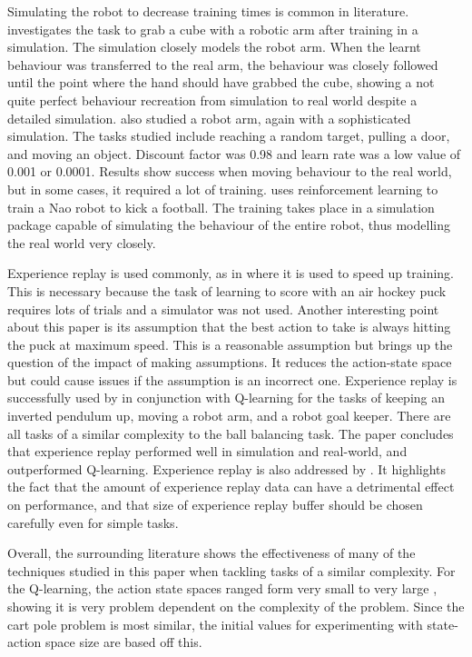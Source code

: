 \documentclass[12pt,a4paper]{article}
\begin{document}
Simulating the robot to decrease training times is common in literature. \cite{sim_robot_arm} investigates the task to grab a cube with a robotic arm after training in a simulation. The simulation closely models the robot arm. When the learnt behaviour was transferred to the real arm, the behaviour was closely followed until the point where the hand should have grabbed the cube, showing a not quite perfect behaviour recreation from simulation to real world despite a detailed simulation. \cite{arm_sim_door} also studied a robot arm, again with a sophisticated simulation. The tasks studied include reaching a random target, pulling a door, and moving an object. Discount factor was 0.98 and learn rate was a low value of 0.001 or 0.0001. Results show success when moving behaviour to the real world, but in some cases, it required a lot of training. \cite{nao_football} uses reinforcement learning to train a Nao robot to kick a football. The training takes place in a simulation package capable of simulating the behaviour of the entire robot, thus modelling the real world very closely. 

Experience replay is used commonly, as in \cite{air_hockey} where it is used to speed up training. This is necessary because the task of learning to score with an air hockey puck requires lots of trials and a simulator was not used. Another interesting point about this paper is its assumption that the best action to take is always hitting the puck at maximum speed. This is a reasonable assumption but brings up the question of the impact of making assumptions. It reduces the action-state space but could cause issues if the assumption is an incorrect one. Experience replay is successfully used by \cite{er} in conjunction with Q-learning for the tasks of keeping an inverted pendulum up, moving a robot arm, and a robot goal keeper. There are all tasks of a similar complexity to the ball balancing task. The paper concludes that experience replay performed well in simulation and real-world, and outperformed Q-learning. Experience replay is also addressed by \cite{er_deeper}. It highlights the fact that the amount of experience replay data can have a detrimental effect on performance, and that size of experience replay buffer should be chosen carefully even for simple tasks.

Overall, the surrounding literature shows the effectiveness of many of the techniques studied in this paper when tackling tasks of a similar complexity. For the Q-learning, the action state spaces ranged form very small \cite{cart_pole_webpage} to very large \cite{nao_balance}, showing it is very problem dependent on the complexity of the problem. Since the cart pole problem is most similar, the initial values for experimenting with state-action space size are based off this.
\end{document}
